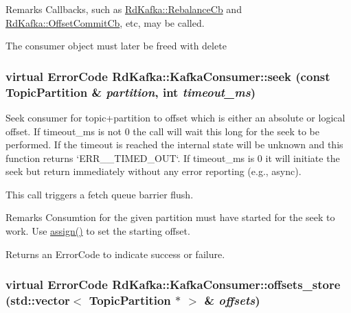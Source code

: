 \begin{DoxyRemark}{Remarks}
Callbacks, such as \hyperlink{classRdKafka_1_1RebalanceCb}{RdKafka::RebalanceCb} and \hyperlink{classRdKafka_1_1OffsetCommitCb}{RdKafka::OffsetCommitCb}, etc, may be called.

The consumer object must later be freed with {\ttfamily delete} 
\end{DoxyRemark}
\hypertarget{classRdKafka_1_1KafkaConsumer_ab08a9a8175edd12ae4e1d5bb0eb50479}{
\subsubsection[{seek}]{\setlength{\rightskip}{0pt plus 5cm}virtual ErrorCode RdKafka::KafkaConsumer::seek (const {\bf TopicPartition} \& {\em partition}, \/  int {\em timeout\_\-ms})}}
\label{classRdKafka_1_1KafkaConsumer_ab08a9a8175edd12ae4e1d5bb0eb50479}


Seek consumer for topic+partition to offset which is either an absolute or logical offset. If {\ttfamily timeout\_\-ms} is not 0 the call will wait this long for the seek to be performed. If the timeout is reached the internal state will be unknown and this function returns `ERR\_\-\_\-TIMED\_\-OUT`. If {\ttfamily timeout\_\-ms} is 0 it will initiate the seek but return immediately without any error reporting (e.g., async).

This call triggers a fetch queue barrier flush.

\begin{DoxyRemark}{Remarks}
Consumtion for the given partition must have started for the seek to work. Use \hyperlink{classRdKafka_1_1KafkaConsumer_af3f872bcb7d46febbaea63518f854b46}{assign()} to set the starting offset.
\end{DoxyRemark}
\begin{DoxyReturn}{Returns}
an ErrorCode to indicate success or failure. 
\end{DoxyReturn}
\hypertarget{classRdKafka_1_1KafkaConsumer_ab693da27c7664692d2247398d483e931}{
\subsubsection[{offsets\_\-store}]{\setlength{\rightskip}{0pt plus 5cm}virtual ErrorCode RdKafka::KafkaConsumer::offsets\_\-store (std::vector$<$ {\bf TopicPartition} $\ast$ $>$ \& {\em offsets})}}
\label{classRdKafka_1_1KafkaConsumer_ab693da27c7664692d2247398d483e931}


